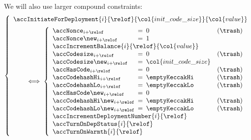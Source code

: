 We will also use larger compound constraints:
\[
	\left\{ \begin{array}{l}
		\accInitiateForDeployment
		{i}{\relof}
		{\col{init\_code\_size}}
		{\col{value}} 
		\vspace{2mm} \\
		\qquad \iff
		\left\{ \begin{array}{lclr}
			\accNonce            _{i + \relof} & \!\!\! = \!\!\! & 0  & (\trash) \\
			\accNonce\new        _{i + \relof} & \!\!\! = \!\!\! & 1 \\
			\multicolumn{3}{l}{\accIncrementBalance {i}{\relof}{\col{value}}} \\
			\accCodesize         _{i + \relof} & \!\!\! = \!\!\! & 0                       & (\trash) \\
			\accCodesize\new     _{i + \relof} & \!\!\! = \!\!\! & \col{init\_code\_size} \\
			\accHasCode          _{i + \relof} & \!\!\! = \!\!\! & 0                       & (\trash) \\
			\accCodehashHi       _{i + \relof} & \!\!\! = \!\!\! & \emptyKeccakHi          & (\trash) \\
			\accCodehashLo       _{i + \relof} & \!\!\! = \!\!\! & \emptyKeccakLo          & (\trash) \\
			\accHasCode\new      _{i + \relof} & \!\!\! = \!\!\! & 0                      \\
			\accCodehashHi\new   _{i + \relof} & \!\!\! = \!\!\! & \emptyKeccakHi          & (\trash) \\
			\accCodehashLo\new   _{i + \relof} & \!\!\! = \!\!\! & \emptyKeccakLo          & (\trash) \\
			\multicolumn{3}{l}{\accIncrementDeploymentNumber {i}{\relof}} \\ 
			\multicolumn{3}{l}{\accTurnOnDepStatus    {i}{\relof}} \\
			\multicolumn{3}{l}{\accTurnOnWarmth       {i}{\relof}} \\
		\end{array} \right. \\
	\end{array} \right.
\]
